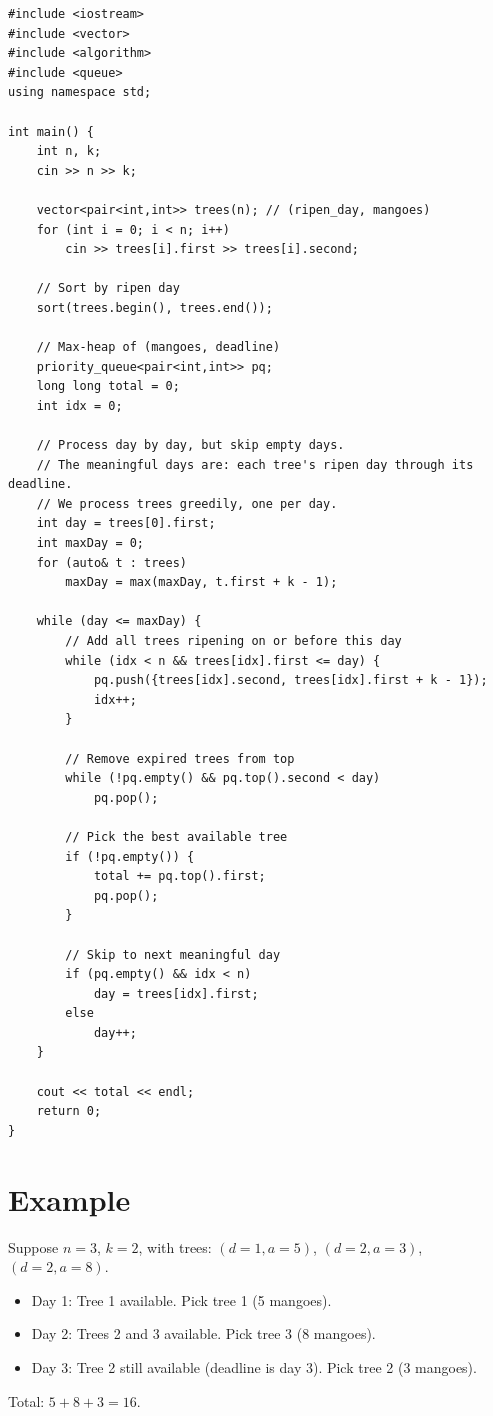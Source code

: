 \documentclass[11pt,a4paper]{article}
\begin{document}
\begin{lstlisting}
#include <iostream>
#include <vector>
#include <algorithm>
#include <queue>
using namespace std;

int main() {
    int n, k;
    cin >> n >> k;

    vector<pair<int,int>> trees(n); // (ripen_day, mangoes)
    for (int i = 0; i < n; i++)
        cin >> trees[i].first >> trees[i].second;

    // Sort by ripen day
    sort(trees.begin(), trees.end());

    // Max-heap of (mangoes, deadline)
    priority_queue<pair<int,int>> pq;
    long long total = 0;
    int idx = 0;

    // Process day by day, but skip empty days.
    // The meaningful days are: each tree's ripen day through its deadline.
    // We process trees greedily, one per day.
    int day = trees[0].first;
    int maxDay = 0;
    for (auto& t : trees)
        maxDay = max(maxDay, t.first + k - 1);

    while (day <= maxDay) {
        // Add all trees ripening on or before this day
        while (idx < n && trees[idx].first <= day) {
            pq.push({trees[idx].second, trees[idx].first + k - 1});
            idx++;
        }

        // Remove expired trees from top
        while (!pq.empty() && pq.top().second < day)
            pq.pop();

        // Pick the best available tree
        if (!pq.empty()) {
            total += pq.top().first;
            pq.pop();
        }

        // Skip to next meaningful day
        if (pq.empty() && idx < n)
            day = trees[idx].first;
        else
            day++;
    }

    cout << total << endl;
    return 0;
}
\end{lstlisting}

\section{Example}

Suppose $n = 3$, $k = 2$, with trees: $(d=1, a=5)$, $(d=2, a=3)$,
$(d=2, a=8)$.

\begin{itemize}
  \item Day 1: Tree 1 available. Pick tree 1 (5 mangoes).
  \item Day 2: Trees 2 and 3 available. Pick tree 3 (8 mangoes).
  \item Day 3: Tree 2 still available (deadline is day 3). Pick tree 2
    (3 mangoes).
\end{itemize}

Total: $5 + 8 + 3 = 16$.
\end{document}
